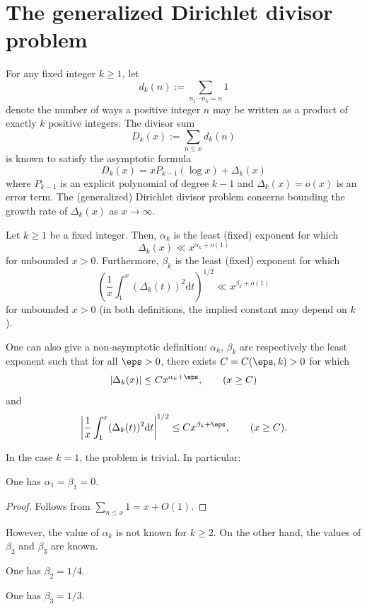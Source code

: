 \chapter{The generalized Dirichlet divisor problem}\label{divisor-chapter}

For any fixed integer $k \ge 1$, let 
\[
d_k(n) := \sum_{n_1 \cdots n_k = n}1
\]
denote the number of ways a positive integer $n$ may be written as a product of exactly $k$ positive integers. The divisor sum
\[
D_k(x) := \sum_{n \leq x} d_k(n)
\]
is known to satisfy the asymptotic formula 
\[
D_k(x) = x P_{k - 1}(\log x) + \Delta_k(x)
\]
where $P_{k - 1}$ is an explicit polynomial of degree $k-1$ and $\Delta_k(x) = o(x)$ is an error term. The (generalized) Dirichlet divisor problem concerns bounding the growth rate of $\Delta_k(x)$ as $x\to\infty$. 

\begin{definition}\label{divisor-def} Let $k \geq 1$ be a fixed integer. Then, $\alpha_k$ is the least (fixed) exponent for which
$$ \Delta_k(x) \ll x^{\alpha_k+o(1)}$$
for unbounded $x > 0$. Furthermore, $\beta_k$ is the least (fixed) exponent for which 
\[
\left(\frac{1}{x}\int_1^x (\Delta_k(t))^2\text{d}t\right)^{1/2} \ll x^{\beta_k + o(1)}
\]
for unbounded $x > 0$ (in both definitions, the implied constant may depend on $k$).
\end{definition}

One can also give a non-asymptotic definition: $\alpha_k$, $\beta_k$ are respectively the least exponent such that for all $\eps > 0$, there exists $C = C(\eps, k) > 0$ for which
\[
|\Delta_k(x)| \leq C x^{\alpha_k + \eps},\qquad (x \ge C)
\]
and
\[
\left|\frac{1}{x}\int_1^x(\Delta_k(t))^2\text{d}t\right|^{1/2} \le Cx^{\beta_k + \eps},\qquad (x \ge C).
\]

In the case $k = 1$, the problem is trivial. In particular:

\begin{lemma}[$d_1$ exponent]\label{divisor-1} One has $\alpha_1=\beta_1=0$.
\end{lemma}
\begin{proof}
Follows from $\sum_{n \le x}1 = x + O(1)$. 
\end{proof}

However, the value of $\alpha_k$ is not known for $k \ge 2$. On the other hand, the values of $\beta_2$ and $\beta_3$ are known.

\begin{theorem}\label{avg-divisor-2} 
One has $\beta_2 = 1/4$.
\end{theorem}
\begin{theorem}\label{avg-divisor-3} 
One has $\beta_3 = 1/3$.
\end{theorem}

